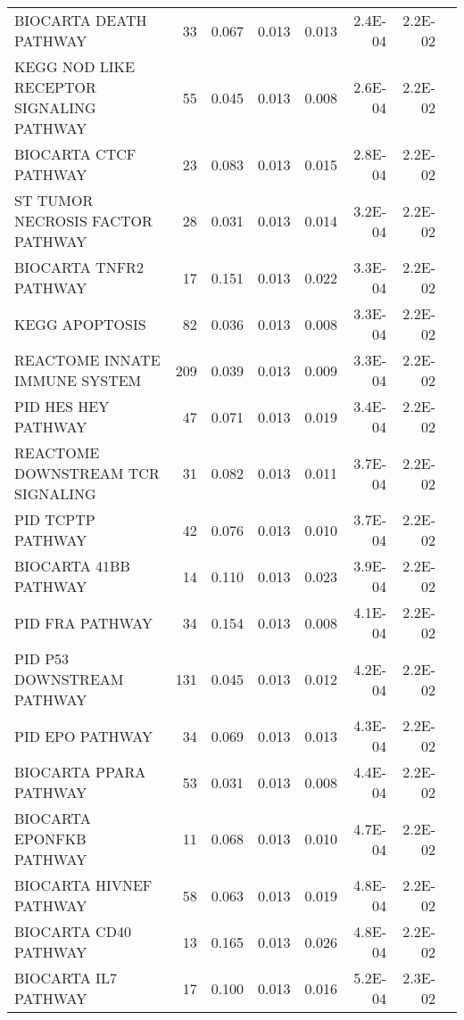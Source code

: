 \begin{table}[!ht]
{\begin{tabular}{p{3in}rrrrrrr}
			BIOCARTA DEATH PATHWAY & 33 & 0.067 & 0.013 & 0.013 & 2.4E-04 & 2.2E-02 &  \\ 
			KEGG NOD LIKE RECEPTOR SIGNALING PATHWAY & 55 & 0.045 & 0.013 & 0.008 & 2.6E-04 & 
			2.2E-02 &  \\ 
			BIOCARTA CTCF PATHWAY & 23 & 0.083 & 0.013 & 0.015 & 2.8E-04 & 2.2E-02 &  \\ 
			ST TUMOR NECROSIS FACTOR PATHWAY & 28 & 0.031 & 0.013 & 0.014 & 3.2E-04 & 2.2E-02 &  \\ 
			BIOCARTA TNFR2 PATHWAY & 17 & 0.151 & 0.013 & 0.022 & 3.3E-04 & 2.2E-02 &  \\ 
			KEGG APOPTOSIS & 82 & 0.036 & 0.013 & 0.008 & 3.3E-04 & 2.2E-02 &  \\ 
			REACTOME INNATE IMMUNE SYSTEM & 209 & 0.039 & 0.013 & 0.009 & 3.3E-04 & 2.2E-02 &  \\ 
			PID HES HEY PATHWAY & 47 & 0.071 & 0.013 & 0.019 & 3.4E-04 & 2.2E-02 &  \\ 
			REACTOME DOWNSTREAM TCR SIGNALING & 31 & 0.082 & 0.013 & 0.011 & 3.7E-04 & 2.2E-02 &  
			\\ 
			PID TCPTP PATHWAY & 42 & 0.076 & 0.013 & 0.010 & 3.7E-04 & 2.2E-02 &  \\ 
			BIOCARTA 41BB PATHWAY & 14 & 0.110 & 0.013 & 0.023 & 3.9E-04 & 2.2E-02 &  \\ 
			PID FRA PATHWAY & 34 & 0.154 & 0.013 & 0.008 & 4.1E-04 & 2.2E-02 &  \\ 
			PID P53 DOWNSTREAM PATHWAY & 131 & 0.045 & 0.013 & 0.012 & 4.2E-04 & 2.2E-02 &  \\ 
			PID EPO PATHWAY & 34 & 0.069 & 0.013 & 0.013 & 4.3E-04 & 2.2E-02 &  \\ 
			BIOCARTA PPARA PATHWAY & 53 & 0.031 & 0.013 & 0.008 & 4.4E-04 & 2.2E-02 &  \\ 
			BIOCARTA EPONFKB PATHWAY & 11 & 0.068 & 0.013 & 0.010 & 4.7E-04 & 2.2E-02 &  \\ 
			BIOCARTA HIVNEF PATHWAY & 58 & 0.063 & 0.013 & 0.019 & 4.8E-04 & 2.2E-02 &  \\ 
			BIOCARTA CD40 PATHWAY & 13 & 0.165 & 0.013 & 0.026 & 4.8E-04 & 2.2E-02 &  \\ 
			BIOCARTA IL7 PATHWAY & 17 & 0.100 & 0.013 & 0.016 & 5.2E-04 & 2.3E-02 &  \\ 
			\hline
		\end{tabular}
	}
		\label{table:top30}
	\end{table}

	
	
	
